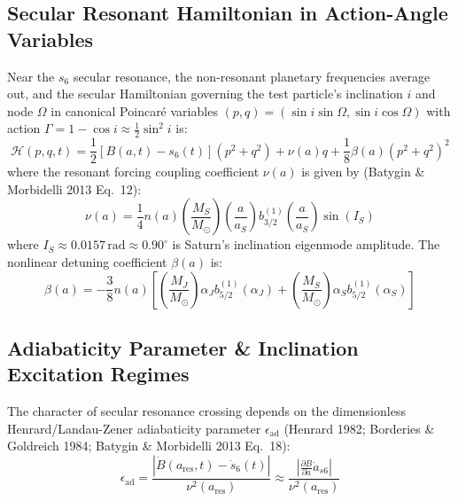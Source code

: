 \documentclass[11pt,a4paper]{article}
\begin{document}
\subsection{Secular Resonant Hamiltonian in Action-Angle Variables}
Near the $s_6$ secular resonance, the non-resonant planetary frequencies average out, and the secular Hamiltonian governing the test particle's inclination $i$ and node $\Omega$ in canonical Poincaré variables $(p, q) = (\sin i \sin\Omega, \sin i \cos\Omega)$ with action $\Gamma = 1 - \cos i \approx \frac{1}{2} \sin^2 i$ is:
\begin{equation}
\mathcal{H}(p, q, t) = \frac{1}{2} [B(a, t) - s_6(t)] (p^2 + q^2) + \nu(a) q + \frac{1}{8} \beta(a) (p^2 + q^2)^2
\label{eq:hamiltonian}
\end{equation}
where the resonant forcing coupling coefficient $\nu(a)$ is given by (Batygin \& Morbidelli 2013 Eq.~12):
\begin{equation}
\nu(a) = \frac{1}{4} n(a) \left(\frac{M_S}{M_\odot}\right) \left(\frac{a}{a_S}\right) b_{3/2}^{(1)}\left(\frac{a}{a_S}\right) \sin(I_S)
\label{eq:nu_forcing}
\end{equation}
where $I_S \approx 0.0157\,\text{rad} \approx 0.90^\circ$ is Saturn's inclination eigenmode amplitude. The nonlinear detuning coefficient $\beta(a)$ is:
\begin{equation}
\beta(a) = -\frac{3}{8} n(a) \left[ \left(\frac{M_J}{M_\odot}\right) \alpha_J b_{5/2}^{(1)}(\alpha_J) + \left(\frac{M_S}{M_\odot}\right) \alpha_S b_{5/2}^{(1)}(\alpha_S) \right]
\label{eq:beta_detuning}
\end{equation}

\subsection{Adiabaticity Parameter \& Inclination Excitation Regimes}
The character of secular resonance crossing depends on the dimensionless Henrard/Landau-Zener adiabaticity parameter $\epsilon_{\text{ad}}$ (Henrard 1982; Borderies \& Goldreich 1984; Batygin \& Morbidelli 2013 Eq.~18):
\begin{equation}
\epsilon_{\text{ad}} = \frac{|\dot{B}(a_{\text{res}}, t) - \dot{s}_6(t)|}{\nu^2(a_{\text{res}})} \approx \frac{\left|\frac{\partial B}{\partial a} \dot{a}_{s6}\right|}{\nu^2(a_{\text{res}})}
\label{eq:epsilon_ad}
\end{equation}
\end{document}
